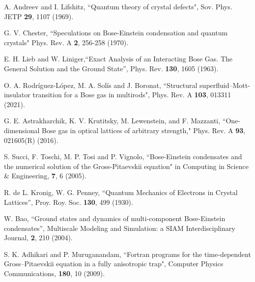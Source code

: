 \documentclass[twocolumn,showpacs,showkeys,preprintnumbers,superscriptaddress, pra, 10pt, aps]{revtex4-2}
\begin{document}
\begin{thebibliography}{55}
  A. Andreev and I. Lifshitz,  ``Quantum theory of crystal defects", Sov. Phys. JETP \textbf{29}, 1107 (1969).

  	 G. V. Chester, ``Speculations on Bose-Einstein condensation and quantum crystals" Phys. Rev. A {\bf 2}, 256-258 (1970).

  E. H. Lieb and W. Liniger,``Exact Analysis of an Interacting Bose Gas. The General Solution and the Ground State”,  Phys. Rev. \textbf{130}, 1605 (1963).

  O. A. Rodríguez-López, M. A. Solís and J. Boronat, ``Structural superfluid–Mott-insulator transition for a Bose gas in multirods", Phys. Rev. A \textbf{103}, 013311 (2021).

  G. E. Astrakharchik, K. V. Krutitsky, M. Lewenstein, and F. Mazzanti, ``One-dimensional Bose gas in optical lattices of arbitrary strength," Phys. Rev. A \textbf{93}, 021605(R) (2016).




  S. Succi, F. Toschi, M. P. Tosi and P. Vignolo, ``Bose-Einstein condensates and the numerical solution of the Gross-Pitaevskii equation" in Computing in Science \& Engineering, \textbf{7}, 6 (2005).

  R. de L. Kronig, W. G. Penney, ``Quantum Mechanics of Electrons in Crystal Lattices'', Proy. Roy. Soc. \textbf{130}, 499 (1930).

  W. Bao, ``Ground states and dynamics of multi-component Bose-Einstein condensates'', Multiscale Modeling and Simulation: a SIAM Interdisciplinary Journal, \textbf{2}, 210 (2004).

  S. K. Adhikari and P. Muruganandam, ``Fortran programs for the time-dependent Gross–Pitaevskii equation in a fully anisotropic trap", Computer Physics Communications,  \textbf{180}, 10 (2009).



\end{thebibliography}
\end{document}
